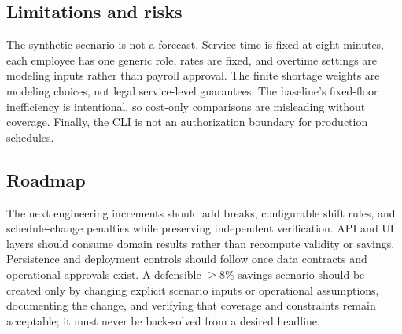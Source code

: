 \documentclass[11pt,a4paper]{article}
\begin{document}
\subsection{Limitations and risks}
The synthetic scenario is not a forecast. Service time is fixed at eight minutes, each employee has one generic role, rates are fixed, and overtime settings are modeling inputs rather than payroll approval. The finite shortage weights are modeling choices, not legal service-level guarantees. The baseline's fixed-floor inefficiency is intentional, so cost-only comparisons are misleading without coverage. Finally, the CLI is not an authorization boundary for production schedules.

\subsection{Roadmap}
The next engineering increments should add breaks, configurable shift rules, and schedule-change penalties while preserving independent verification. API and UI layers should consume domain results rather than recompute validity or savings. Persistence and deployment controls should follow once data contracts and operational approvals exist. A defensible $\ge8\%$ savings scenario should be created only by changing explicit scenario inputs or operational assumptions, documenting the change, and verifying that coverage and constraints remain acceptable; it must never be back-solved from a desired headline.
\end{document}
